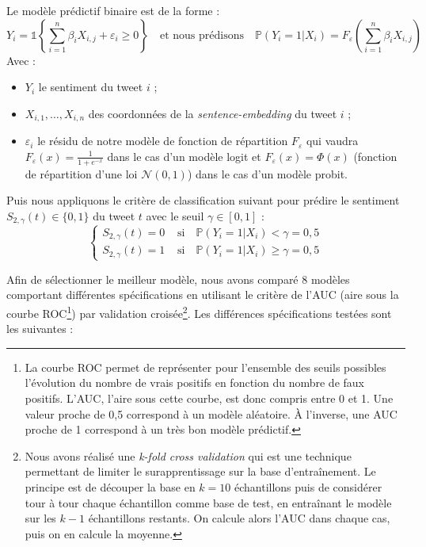 \documentclass[11pt,french,french]{article}
\let\rmarkdownfootnote\footnote%
\def\footnote{\protect\rmarkdownfootnote}
\begin{document}
Le modèle prédictif binaire est de la forme :
\[Y_i = \mathds{1}\left\{ \sum_{i = 1}^n \beta_i X_{i,j} + \varepsilon_i \geq 0 \right\} 
\quad \text{et nous prédisons} \quad  \mathbb{P}(Y_i = 1 | X_{i}) = F_{\varepsilon}\left(\sum_{i = 1}^n \beta_i X_{i,j}\right)\]
Avec :

\begin{itemize}
\item $Y_i$ le sentiment du tweet $i$ ;
\item $X_{i,1}, \dots, X_{i,n}$ des coordonnées de la \emph{sentence-embedding} du tweet $i$ ;
\item $\varepsilon_i$ le résidu de notre modèle de fonction de répartition $F_{\varepsilon}$ qui vaudra $F_{\varepsilon}(x) = \frac{1}{1 + e^{-x}}$ dans le cas d'un modèle logit et $F_{\varepsilon}(x) = \Phi(x)$ (fonction de répartition d'une loi $\mathcal{N}(0, 1)$) dans le cas d'un modèle probit. 
\end{itemize}

Puis nous appliquons le critère de classification suivant pour prédire le sentiment \(S_{2,\gamma}(t) \in \{0,1\}\) du tweet \(t\) avec le seuil \(\gamma \in [0,1]\) :
\[
\begin{cases}
S_{2,\gamma}(t) = 0 &  \text{ si} \quad \mathbb{P}(Y_i = 1 | X_{i}) < \gamma = 0,5 \\
S_{2,\gamma}(t) = 1 &  \text{ si} \quad \mathbb{P}(Y_i = 1 | X_{i}) \ge \gamma = 0,5
\end{cases}
\]

Afin de sélectionner le meilleur modèle, nous avons comparé 8 modèles comportant différentes spécifications en utilisant le critère de l'AUC (aire sous la courbe ROC\footnote{La courbe ROC permet de représenter pour l'ensemble des seuils possibles l'évolution du nombre de vrais positifs en fonction du nombre de faux positifs.
  L'AUC, l'aire sous cette courbe, est donc compris entre 0 et 1. Une valeur proche de 0,5 correspond à un modèle aléatoire. À l'inverse, une AUC proche de 1 correspond à un très bon modèle prédictif.}) par validation croisée\footnote{Nous avons réalisé une \emph{k-fold cross validation} qui est une technique permettant de limiter le surapprentissage sur la base d'entraînement. Le principe est de découper la base en \(k = 10\) échantillons puis de considérer tour à tour chaque échantillon comme base de test, en entraînant le modèle sur les \(k-1\) échantillons restants. On calcule alors l'AUC dans chaque cas, puis on en calcule la moyenne. }. Les différences spécifications testées sont les suivantes :
\end{document}
